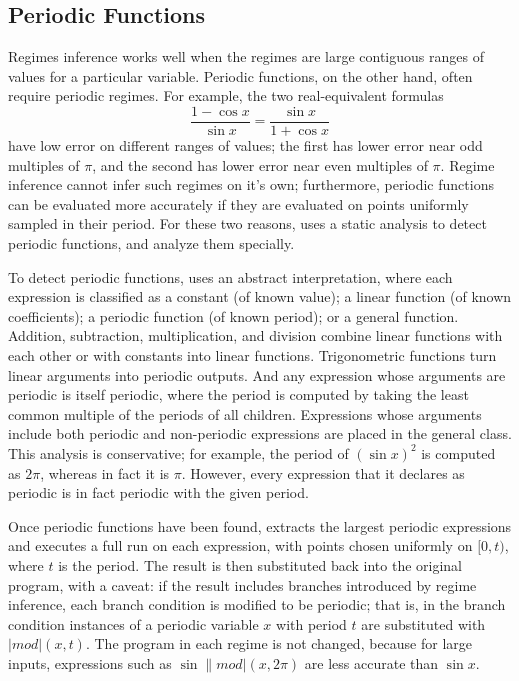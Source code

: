 \documentclass[paper.tex]{subfiles}
\begin{document}
\subsection{Periodic Functions}

Regimes inference works well when the regimes
  are large contiguous ranges of values for a particular variable.
Periodic functions, on the other hand, often require periodic regimes.
For example, the two real-equivalent formulas
\[
\frac{1 - \cos x}{\sin x} = \frac{\sin x}{1 + \cos x}
\]
  have low error on different ranges of values;
  the first has lower error near odd multiples of $\pi$,
  and the second has lower error near even multiples of $\pi$.
Regime inference cannot infer such regimes on it's own; furthermore,
  periodic functions can be evaluated more accurately
  if they are evaluated on points uniformly sampled in their period.
For these two reasons, \casio uses a static analysis
  to detect periodic functions, and analyze them specially.

To detect periodic functions, \casio uses an abstract interpretation,
  where each expression is classified as
  a constant (of known value); a linear function (of known coefficients);
  a periodic function (of known period); or a general function.
Addition, subtraction, multiplication, and division
  combine linear functions with each other or with constants
  into linear functions.
Trigonometric functions turn linear arguments
  into periodic outputs.
And any expression whose arguments are periodic
  is itself periodic, where the period is computed
  by taking the least common multiple of the periods of all children.
Expressions whose arguments include
  both periodic and non-periodic expressions
  are placed in the general class.
This analysis is conservative; for example, the period of $(\sin x)^2$
  is computed as $2 \pi$, whereas in fact it is $\pi$.
However, every expression that it declares as periodic
  is in fact periodic with the given period.

Once periodic functions have been found,
  \casio extracts the largest periodic expressions
  and executes a full \casio run on each expression,
  with points chosen uniformly on $[0, t)$,
  where $t$ is the period.
The result is then substituted back into the original program,
  with a caveat:
  if the result includes branches introduced by regime inference,
  each branch condition is modified to be periodic;
  that is, in the branch condition
  instances of a periodic variable $x$ with period $t$
  are substituted with $|mod|(x, t)$.
The program in each regime is not changed,
  because for large inputs, expressions such as
  $\sin \|mod|(x, 2\pi)$
  are less accurate than $\sin x$.
\end{document}
